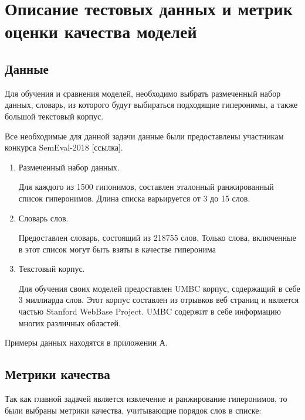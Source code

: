 \section{Описание тестовых данных и метрик оценки качества моделей}
\label{sec:Chapter_3} 
\large


\subsection{Данные}

Для обучения и сравнения моделей, необходимо выбрать размеченный набор данных,
словарь, из которого будут выбираться подходящие гиперонимы, а также большой
текстовый корпус.

Все необходимые для данной задачи данные были предоставлены участникам конкурса
SemEval-2018 [ссылка].

\begin{enumerate}
\item Размеченный набор данных.

Для каждого из 1500 гипонимов, составлен эталонный ранжированный список
гиперонимов. Длина списка варьируется от 3 до 15 слов.

\item Словарь слов.

Предоставлен словарь, состоящий из 218755 слов. Только слова, включенные в
этот список могут быть взяты в качестве гиперонима

\item Текстовый корпус.

Для обучения своих моделей предоставлен UMBC корпус, содержащий в себе 3
миллиарда слов. Этот корпус составлен из отрывков веб страниц и является частью
Stanford WebBase Project. UMBC содержит в себе информацию многих различных
областей.
\end{enumerate}

Примеры данных находятся в приложении А.


\subsection{Метрики качества}

Так как главной задачей является извлечение и ранжирование гиперонимов, то были
выбраны метрики качества, учитывающие порядок слов в списке:

